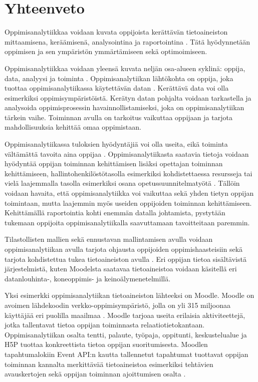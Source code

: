 \chapter{Yhteenveto\label{yhteenveto}}

Oppimisanalytiikkaa voidaan kuvata oppijoista kerättävän tietoaineiston mittaamisena, keräämisenä, analysointina ja raportointina \citep{siemensLearningAnalyticsEmergence2013,clowLearningAnalyticsCycle2012}. Tätä hyödynnetään oppimisen ja sen ympäristön ymmärtämiseen sekä optimoimiseen.

Oppimisanalytiikkaa voidaan yleensä kuvata neljän osa-alueen syklinä: oppija, data, analyysi ja toiminta \citep{clowLearningAnalyticsCycle2012}. Oppimisanalytiikan lähtökohta on oppija, joka tuottaa oppimisanalytiikassa käytettävän datan \citep{wolffImprovingRetentionPredicting2013}. Kerättävä data voi olla esimerkiksi oppimisympäristöistä. Kerätyn datan pohjalta voidaan tarkastella ja analysoida oppimisprosessin havainnollistamiseksi, joka on oppimisanalytiikan tärkein vaihe. Toiminnan avulla on tarkoitus vaikuttaa oppijaan ja tarjota mahdollisuuksia kehittää omaa oppimistaan.

Oppimisanalytiikassa tuloksien hyödyntäjiä voi olla useita, eikä toiminta vältämättä tavoita aina oppijaa \citep{clowLearningAnalyticsCycle2012}. Oppimisanalytiikasta saatavia tietoja voidaan hyödyntää oppijan toiminnan kehittämisen lisäksi opettajan toiminnan kehittämiseen, hallintohenkilöstötasolla esimerkiksi kohdistettaessa resursseja tai vielä laajemmalla tasolla esimerkiksi osana opetussuunnitelmatyötä \citep{clowOverviewLearningAnalytics2013}. Tällöin voidaan havaita, että oppimisanalytiikka voi vaikuttaa sekä yhden tietyn oppijan toimintaan, mutta laajemmin myös useiden oppijoiden toiminnan kehittämiseen. Kehittämällä raportointia kohti enemmän datalla johtamista, pystytään tukemaan oppijoita oppimisanalytiikalla saavuttamaan tavoitteitaan paremmin.

Tilastollisten mallien sekä ennustavan mallintamisen avulla voidaan oppimisanalytiikan avulla tarjota ohjausta oppijoiden oppimishaasteisiin sekä tarjota kohdistettua tukea tietoaineiston avulla \citep{ranjeethSurveyPredictiveModels2020}. Eri oppijan tietoa sisältävistä järjestelmistä, kuten Moodelsta saatavaa tietoaineistoa voidaan käsitellä eri datanlouhinta-, koneoppimis- ja keinoälymenetelmillä.

Yksi esimerkki oppimisanalytiikan tietoaineiston lähteeksi on Moodle. Moodle on avoimen lähdekoodin verkko-oppimisympäristö, jolla on yli 315 miljoonaa käyttäjää eri puolilla maailmaa \citep{dougiamasPowerOpenEducational2021,dougiamasMoodle2022,moodle.orgMoodleStatistics}. Moodle tarjoaa useita erilaisia aktiviteettejä, jotka tallentavat tietoa oppijan toiminnasta relaatiotietokantaan. Oppimisanalytiikan osalta tentti, palaute, työpaja, oppitunti, keskustelualue ja H5P tuottaa konkreettista tietoa oppijan suoritumisesta. Moodlen tapahtumalokiin Event API:n kautta tallennetut tapahtumat tuottavat oppijan toiminnan kannalta merkittävää tietoaineistoa esimerkiksi tehtävien avauskertojen sekä oppijan toiminnan ajoittumisen osalta \citep{dougiamasLoggingMoodleDocs2021, abdullahLearningStyleClassification2015}.

